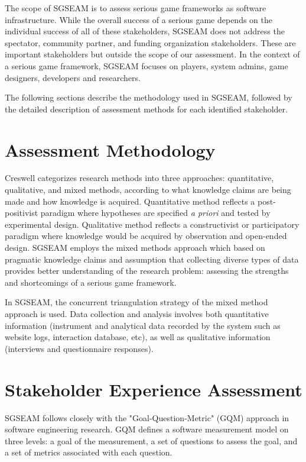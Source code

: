 The scope of SGSEAM is to assess serious game frameworks as software infrastructure. While
the overall success of a serious game depends on the individual success of all of these
stakeholders, SGSEAM does not address the spectator, community partner, and funding
organization stakeholders. These are important stakeholders but outside the scope of our
assessment. In the context of a serious game framework, SGSEAM focuses on players, system admins, game designers, developers and researchers.

The following sections describe the methodology used in SGSEAM, followed by the detailed
description of assessment methods for each identified stakeholder.

\section{Assessment Methodology}
Creswell \cite{creswell2003} categorizes research methods into three approaches:
quantitative, qualitative, and mixed methods, according to what knowledge claims are being made
and how knowledge is acquired. Quantitative method reflects a post-positivist paradigm where
hypotheses are specified {\em a priori} and tested by experimental design. Qualitative method
reflects a constructivist or participatory paradigm where knowledge would be acquired by
observation and open-ended design. SGSEAM employs the mixed methods approach which based on
pragmatic knowledge claims and assumption that collecting diverse types of data provides better
understanding of the research problem: assessing the strengths and shortcomings of a serious game
framework.

In SGSEAM, the concurrent triangulation strategy \cite{creswell2003} of the mixed method approach
is used.  Data collection and analysis involves both quantitative information (instrument and
analytical data recorded by the system such as website logs, interaction database, etc), as well
as qualitative information (interviews and questionnaire responses).

\section{Stakeholder Experience Assessment}

SGSEAM follows closely with the "Goal-Question-Metric" (GQM) approach \cite{caldiera1994goal} in
software engineering research. GQM defines a software  measurement model on three levels: a goal
of the measurement, a set of questions to assess the goal, and a set of metrics associated with
each question.


